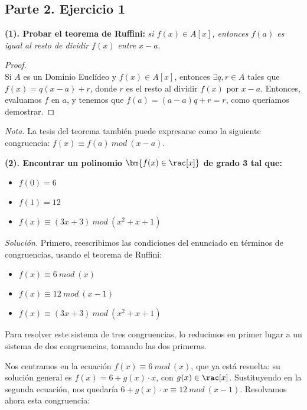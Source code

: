 \subsection{\LARGE{Parte 2. Ejercicio 1}}

\textbf{(1). Probar el teorema de Ruffini:} \textit{si $f(x) \in A[x]$, entonces $f(a)$ es igual al resto de dividir $f(x)$ entre $x-a$}.\\

\begin{proof}
\hfill \\
Si $A$ es un Dominio Euclídeo y $f(x) \in A[x]$, entonces $\exists q,r \in A$ tales que \\$f(x) = q(x-a) + r$, donde $r$ es el resto al dividir $f(x)$ por $x-a$.
Entonces, evaluamos $f$ en $a$, y tenemos que $f(a) = (a-a)q + r = r$, como queríamos demostrar.
\end{proof}

\textit{Nota.} La tesis del teorema también puede expresarse como la siguiente congruencia: $f(x) \equiv f(a)\ mod\ (x-a)$.

\textbf{(2). Encontrar un polinomio $\bm{f(x) \in \rac[x]}$ de grado 3 tal que:}

\begin{itemize}[leftmargin=.15in]
\item $f(0) = 6$
\item $f(1) = 12$
\item $f(x) \equiv (3x + 3)\ mod\ (x^2 + x + 1)$
\end{itemize}

\textit{Solución.}
Primero, reescribimos las condiciones del enunciado en términos de congruencias, usando el teorema de Ruffini:

\begin{itemize}[leftmargin=.15in]
\item $f(x) \equiv 6\ mod\ (x)$
\item $f(x) \equiv 12\ mod\ (x-1)$
\item $f(x) \equiv (3x + 3)\ mod\ (x^2 + x + 1)$
\end{itemize}

Para resolver este sistema de tres congruencias, lo reducimos en primer lugar a un sistema de dos congruencias, tomando las dos primeras.

Nos centramos en la ecuación $f(x) \equiv 6\ mod\ (x)$, que ya está resuelta: su solución general es $f(x) = 6 + g(x)\cdot x$, con $g(x) \in \rac[x]$. Sustituyendo en la segunda ecuación, nos quedaría $6 + g(x)\cdot x \equiv 12\ mod\ (x-1)$. Resolvamos ahora esta congruencia:

